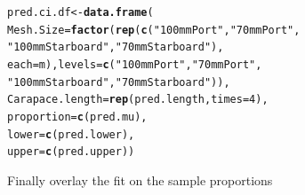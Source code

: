 \documentclass[12pt]{article}\usepackage[]{graphicx}\usepackage[]{color}
\makeatletter
\newcommand{\hlnum}[1]{\textcolor[rgb]{0.686,0.059,0.569}{#1}}%
\newcommand{\hlstr}[1]{\textcolor[rgb]{0.192,0.494,0.8}{#1}}%
\newcommand{\hlstd}[1]{\textcolor[rgb]{0.345,0.345,0.345}{#1}}%
\newcommand{\hlkwb}[1]{\textcolor[rgb]{0.69,0.353,0.396}{#1}}%
\newcommand{\hlkwc}[1]{\textcolor[rgb]{0.333,0.667,0.333}{#1}}%
\newcommand{\hlkwd}[1]{\textcolor[rgb]{0.737,0.353,0.396}{\textbf{#1}}}%
\newenvironment{kframe}{%
 \def\at@end@of@kframe{}%
 \ifinner\ifhmode%
  \def\at@end@of@kframe{\end{minipage}}%
  \begin{minipage}{\columnwidth}%
 \fi\fi%
 \def\FrameCommand##1{\hskip\@totalleftmargin \hskip-\fboxsep
 \colorbox{shadecolor}{##1}\hskip-\fboxsep
     \hskip-\linewidth \hskip-\@totalleftmargin \hskip\columnwidth}%
 \MakeFramed {\advance\hsize-\width
   \@totalleftmargin\z@ \linewidth\hsize
   \@setminipage}}%
 {\par\unskip\endMakeFramed%
 \at@end@of@kframe}
\newenvironment{knitrout}{}{} %
\makeatother
\begin{document}
\begin{knitrout}
\begin{kframe}
\begin{alltt}
\hlstd{pred.ci.df} \hlkwb{<-} \hlkwd{data.frame}\hlstd{(}
                \hlkwc{Mesh.Size} \hlstd{=} \hlkwd{factor}\hlstd{(}\hlkwd{rep}\hlstd{(}\hlkwd{c}\hlstd{(}\hlstr{"100mmPort"}\hlstd{,} \hlstr{"70mmPort"}\hlstd{,}
                  \hlstr{"100mmStarboard"}\hlstd{,} \hlstr{"70mmStarboard"}\hlstd{),}
                 \hlkwc{each} \hlstd{= m),} \hlkwc{levels} \hlstd{=} \hlkwd{c}\hlstd{(}\hlstr{"100mmPort"}\hlstd{,} \hlstr{"70mmPort"}\hlstd{,}
                              \hlstr{"100mmStarboard"}\hlstd{,} \hlstr{"70mmStarboard"}\hlstd{)),}
                \hlkwc{Carapace.length} \hlstd{=} \hlkwd{rep}\hlstd{(pred.length,} \hlkwc{times} \hlstd{=} \hlnum{4}\hlstd{),}
                \hlkwc{proportion} \hlstd{=} \hlkwd{c}\hlstd{(pred.mu),}
                \hlkwc{lower} \hlstd{=} \hlkwd{c}\hlstd{(pred.lower),}
                \hlkwc{upper} \hlstd{=} \hlkwd{c}\hlstd{(pred.upper))}
\end{alltt}
\end{kframe}
\end{knitrout}

Finally overlay the fit on the sample proportions
\end{document}
